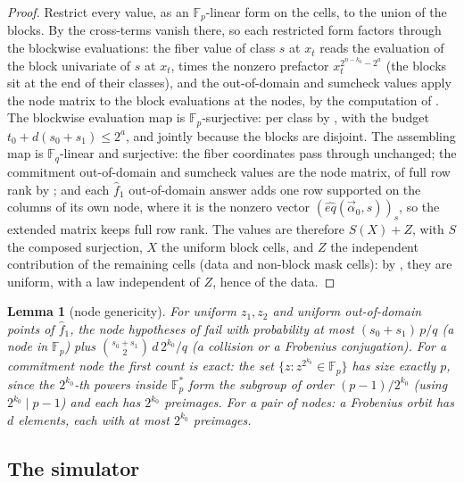 \documentclass{article}
\newcommand{\Fp}{\mathbb{F}_p}
\newcommand{\Fq}{\mathbb{F}_q}
\newcommand{\extdeg}{d}
\newtheorem{lemma}[theorem]{Lemma}
\theoremstyle{definition}
\begin{document}
\begin{proof}
Restrict every value, as an $\Fp$-linear form on the cells, to the union of the blocks. By  the cross-terms vanish there, so each restricted form factors through the blockwise evaluations: the fiber value of class $s$ at $x_t$ reads the evaluation of the block univariate of $s$ at $x_t$, times the nonzero prefactor $x_t^{2^{n - k_0} - 2^a}$ (the blocks sit at the end of their classes), and the out-of-domain and sumcheck values apply the node matrix to the block evaluations at the nodes, by the computation of . The blockwise evaluation map is $\Fp$-surjective: per class by , with the budget $t_0 + \extdeg(s_0 + s_1) \leq 2^a$, and jointly because the blocks are disjoint. The assembling map is $\Fq$-linear and surjective: the fiber coordinates pass through unchanged; the commitment out-of-domain and sumcheck values are the node matrix, of full row rank by ; and each $\hat{f}_1$ out-of-domain answer adds one row supported on the columns of its own node, where it is the nonzero vector $(\hat{eq}(\vec{\alpha}_0, s))_s$, so the extended matrix keeps full row rank. The values are therefore $S(X) + Z$, with $S$ the composed surjection, $X$ the uniform block cells, and $Z$ the independent contribution of the remaining cells (data and non-block mask cells): by , they are uniform, with a law independent of $Z$, hence of the data.
\end{proof}

\begin{lemma}[node genericity]\label{lem:nodeprob}
For uniform $z_1, z_2$ and uniform out-of-domain points of $\hat{f}_1$, the node hypotheses of  fail with probability at most $(s_0 + s_1)\, p/q$ (a node in $\Fp$) plus $\binom{s_0 + s_1}{2}\, \extdeg\, 2^{k_0}/q$ (a collision or a Frobenius conjugation). For a commitment node the first count is exact: the set $\{z : z^{2^{k_0}} \in \Fp\}$ has size exactly $p$, since the $2^{k_0}$-th powers inside $\Fp^*$ form the subgroup of order $(p-1)/2^{k_0}$ (using $2^{k_0} \mid p - 1$) and each has $2^{k_0}$ preimages. For a pair of nodes: a Frobenius orbit has $\extdeg$ elements, each with at most $2^{k_0}$ preimages.
\end{lemma}

\subsection{The simulator}\label{sec:simulator}
\end{document}
